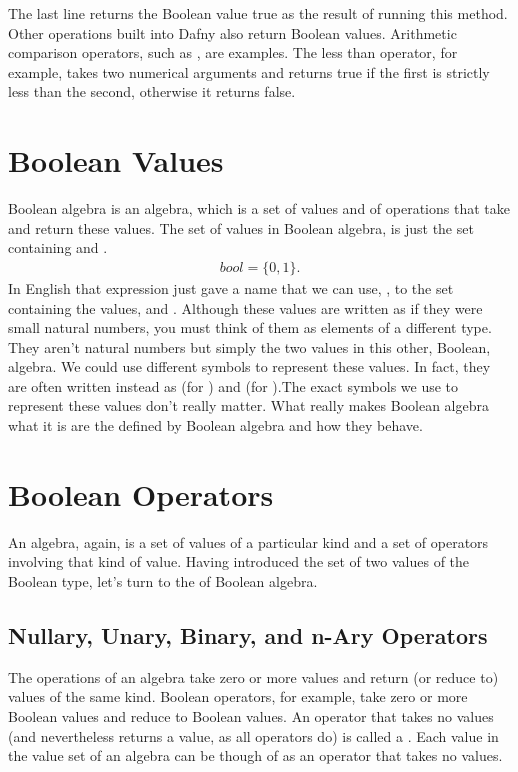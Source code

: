\documentclass[letterpaper,10pt,english]{sphinxmanual}
\begin{document}
The last line returns the Boolean value true as the result of running
this method. Other operations built into Dafny also return Boolean
values.  Arithmetic comparison operators, such as \sphinxstyleemphasis{\textless{}}, are examples.
The less than operator, for example, takes two numerical arguments and
returns true if the first is strictly less than the second, otherwise
it returns false.


\section{Boolean Values}
\label{\detokenize{08-boolean-algebra:boolean-values}}
Boolean algebra is an algebra, which is a set of values and of
operations that take and return these values. The set of values in
Boolean algebra, is just the set containing  and .
\begin{equation*}
\begin{split}bool = \{ 0, 1 \}.\end{split}
\end{equation*}
In English that expression just gave a name that we can use, ,
to the set containing the values,  and . Although these values
are written as if they were small natural numbers, you must think of
them as elements of a different type. They aren’t natural numbers but
simply the two values in this other, Boolean, algebra. We could use
different symbols to represent these values. In fact, they are often
written instead as  (for ) and  (for ).The exact
symbols we use to represent these values don’t really matter. What
really makes Boolean algebra what it is are the  defined
by Boolean algebra and how they behave.


\section{Boolean Operators}
\label{\detokenize{08-boolean-algebra:boolean-operators}}
An algebra, again, is a set of values of a particular kind and a set
of operators involving that kind of value. Having introduced the set
of two values of the Boolean type, let’s turn to the  of
Boolean algebra.


\subsection{Nullary, Unary, Binary, and n-Ary Operators}
\label{\detokenize{08-boolean-algebra:nullary-unary-binary-and-n-ary-operators}}
The operations of an algebra take zero or more values and return (or
reduce to) values of the same kind. Boolean operators, for example,
take zero or more Boolean values and reduce to Boolean values. An
operator that takes no values (and nevertheless returns a value, as
all operators do) is called a . Each value in the value set
of an algebra can be though of as an operator that takes no values.
\end{document}
